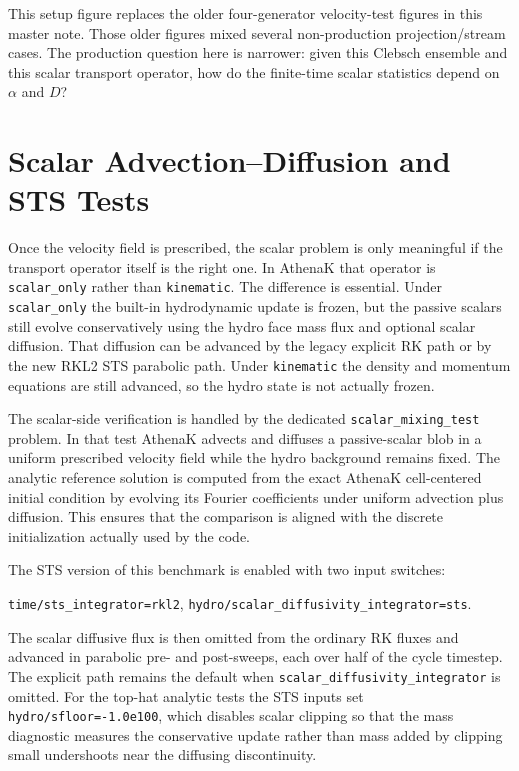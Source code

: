 \documentclass[11pt]{article}
\newcommand{\code}[1]{\texttt{#1}}
\newcommand{\SO}{\code{scalar\_only}\xspace}
\newcommand{\kin}{\code{kinematic}\xspace}
\begin{document}
This setup figure replaces the older four-generator velocity-test figures in
this master note. Those older figures mixed several non-production
projection/stream cases. The production question here is narrower:
given this Clebsch ensemble and this scalar transport operator, how do the
finite-time scalar statistics depend on $\alpha$ and $D$?

\section{Scalar Advection--Diffusion and STS Tests}
Once the velocity field is prescribed, the scalar problem is only meaningful if the transport operator itself is the right one. In AthenaK that operator is \SO rather than \kin. The difference is essential. Under \SO the built-in hydrodynamic update is frozen, but the passive scalars still evolve conservatively using the hydro face mass flux and optional scalar diffusion. That diffusion can be advanced by the legacy explicit RK path or by the new RKL2 STS parabolic path. Under \kin the density and momentum equations are still advanced, so the hydro state is not actually frozen.

The scalar-side verification is handled by the dedicated \code{scalar\_mixing\_test} problem. In that test AthenaK advects and diffuses a passive-scalar blob in a uniform prescribed velocity field while the hydro background remains fixed. The analytic reference solution is computed from the exact AthenaK cell-centered initial condition by evolving its Fourier coefficients under uniform advection plus diffusion. This ensures that the comparison is aligned with the discrete initialization actually used by the code.

The STS version of this benchmark is enabled with two input switches:
\begin{center}
\code{time/sts\_integrator=rkl2},\qquad
\code{hydro/scalar\_diffusivity\_integrator=sts}.
\end{center}
The scalar diffusive flux is then omitted from the ordinary RK fluxes and advanced in parabolic pre- and post-sweeps, each over half of the cycle timestep. The explicit path remains the default when \code{scalar\_diffusivity\_integrator} is omitted. For the top-hat analytic tests the STS inputs set \code{hydro/sfloor=-1.0e100}, which disables scalar clipping so that the mass diagnostic measures the conservative update rather than mass added by clipping small undershoots near the diffusing discontinuity.
\end{document}

